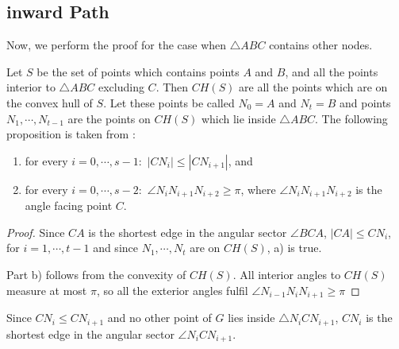  
%
%




\subsection{inward Path}
Now, we perform the proof for the case when $\triangle{ABC} $ contains other nodes.

Let $S $ be the set of points which contains points $A $ and $B $, and all the points interior to $\triangle{ABC} $ excluding $C $.
Then $CH(S) $ are all the points which are on the convex hull of $S $.
Let these points be called $N_0=A $ and $N_t=B $ and points $N_1 , \cdots ,N_{t-1} $ are the points on $CH(S) $ which lie inside $\triangle{ABC} $. 
The following proposition is taken from \cite{kanj}:
\begin{prop}
\label{inward_pre}
\begin{enumerate}
\renewcommand{\labelenumi}{\alph{enumi})}
The following are true:
\item for every $i =0,\cdots,s-1: $ $|CN_i| \leq |CN_{i+1}| $, and
\item for every $i=0, \cdots, s-2: $  $\angle{N_{i}N_{i+1}N_{i+2}} \geq \pi $, where $\angle{N_{i}N_{i+1}N_{i+2}} $ is the angle facing point $C $.
\end{enumerate} 
\end{prop}
\begin{proof}
Since $CA $ is the shortest edge in the angular sector $\angle{BCA} $, $|CA| \leq CN_i $, for $i=1 ,\cdots, t-1 $  and since $N_1 , \cdots, N_t $ are on $CH(S) $, a) is true.

Part b) follows from the convexity of $CH(S) $. All interior angles to $CH(S) $ measure at most $\pi $, so all the exterior angles fulfil $\angle{N_{i-1}N_iN_{i+1}}\geq \pi $ 
\end{proof}

Since $CN_i \leq CN_{i+1} $ and no other point of $G $ lies inside $\triangle{N_iCN_{i+1}} $, $CN_i $ is the shortest edge in the angular sector $\angle{N_iCN_{i+1}} $.